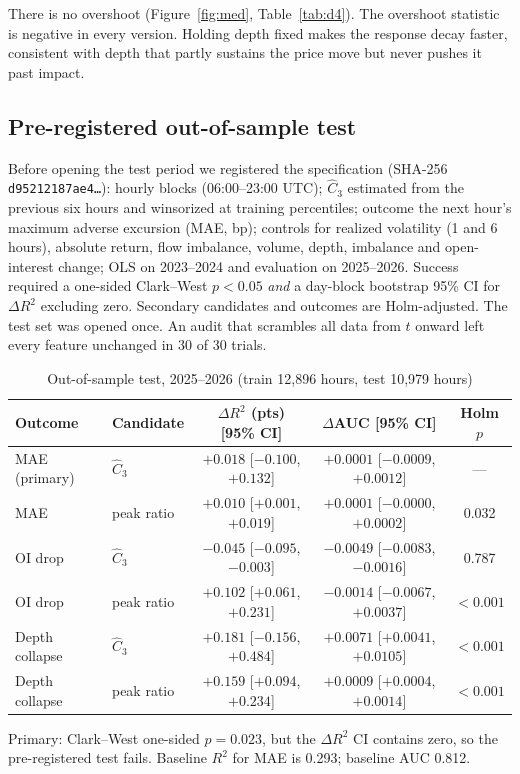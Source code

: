 \documentclass[12pt]{article}
\theoremstyle{definition}
\theoremstyle{remark}
\begin{document}
There is no overshoot (Figure~\ref{fig:med}, Table~\ref{tab:d4}). The overshoot statistic is negative in every version. Holding depth fixed makes the response decay faster, consistent with depth that partly sustains the price move but never pushes it past impact.

\subsection{Pre-registered out-of-sample test}
Before opening the test period we registered the specification (SHA-256 \texttt{d95212187ae4\ldots}): hourly blocks (06:00--23:00 UTC); $\hat C_3$ estimated from the previous six hours and winsorized at training percentiles; outcome the next hour's maximum adverse excursion (MAE, bp); controls for realized volatility (1 and 6 hours), absolute return, flow imbalance, volume, depth, imbalance and open-interest change; OLS on 2023--2024 and evaluation on 2025--2026. Success required a one-sided Clark--West $p<0.05$ \emph{and} a day-block bootstrap 95\% CI for $\Delta R^2$ excluding zero. Secondary candidates and outcomes are Holm-adjusted. The test set was opened once. An audit that scrambles all data from $t$ onward left every feature unchanged in 30 of 30 trials.

\begin{table}[t]\centering
\begin{threeparttable}
\caption{Out-of-sample test, 2025--2026 (train 12,896 hours, test 10,979 hours)}\label{tab:d8}
\small\setlength{\tabcolsep}{4pt}
\begin{tabular}{llccc}
\toprule
Outcome & Candidate & $\Delta R^2$ (pts) [95\% CI] & $\Delta$AUC [95\% CI] & Holm $p$\\
\midrule
MAE (primary) & $\hat C_3$ & $+0.018$ [$-0.100$, $+0.132$] & $+0.0001$ [$-0.0009$, $+0.0012$] & ---\\
MAE & peak ratio & $+0.010$ [$+0.001$, $+0.019$] & $+0.0001$ [$-0.0000$, $+0.0002$] & 0.032\\
OI drop & $\hat C_3$ & $-0.045$ [$-0.095$, $-0.003$] & $-0.0049$ [$-0.0083$, $-0.0016$] & 0.787\\
OI drop & peak ratio & $+0.102$ [$+0.061$, $+0.231$] & $-0.0014$ [$-0.0067$, $+0.0037$] & $<0.001$\\
Depth collapse & $\hat C_3$ & $+0.181$ [$-0.156$, $+0.484$] & $+0.0071$ [$+0.0041$, $+0.0105$] & $<0.001$\\
Depth collapse & peak ratio & $+0.159$ [$+0.094$, $+0.234$] & $+0.0009$ [$+0.0004$, $+0.0014$] & $<0.001$\\
\bottomrule
\end{tabular}
\begin{tablenotes}\footnotesize\item Primary: Clark--West one-sided $p=0.023$, but the $\Delta R^2$ CI contains zero, so the pre-registered test fails. Baseline $R^2$ for MAE is 0.293; baseline AUC 0.812. \end{tablenotes}
\end{threeparttable}
\end{table}
\end{document}
